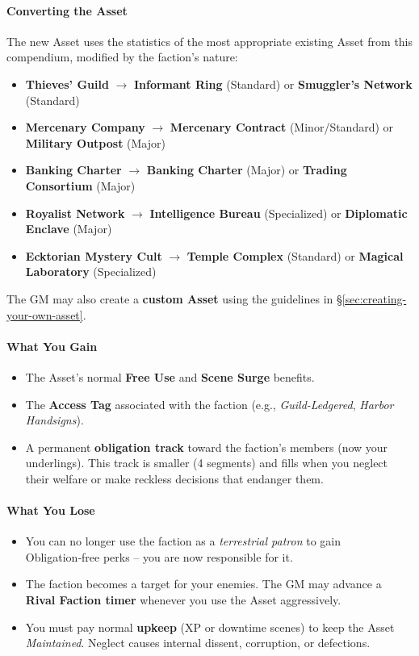 \begin{tcolorbox}[colback=black!3!white,colframe=black!60!white,title=From Faction to Asset: Taking Over a Terrestrial Patron,label=sec:takeover-sidebar,breakable]
\paragraph{Converting the Asset}
The new Asset uses the statistics of the most appropriate existing Asset from this compendium, modified by the faction's nature:
\begin{itemize}
  \item \textbf{Thieves' Guild} $\rightarrow$ \textbf{Informant Ring} (Standard) or \textbf{Smuggler's Network} (Standard)
  \item \textbf{Mercenary Company} $\rightarrow$ \textbf{Mercenary Contract} (Minor/Standard) or \textbf{Military Outpost} (Major)
  \item \textbf{Banking Charter} $\rightarrow$ \textbf{Banking Charter} (Major) or \textbf{Trading Consortium} (Major)
  \item \textbf{Royalist Network} $\rightarrow$ \textbf{Intelligence Bureau} (Specialized) or \textbf{Diplomatic Enclave} (Major)
  \item \textbf{Ecktorian Mystery Cult} $\rightarrow$ \textbf{Temple Complex} (Standard) or \textbf{Magical Laboratory} (Specialized)
\end{itemize}
The GM may also create a \textbf{custom Asset} using the guidelines in \S\ref{sec:creating-your-own-asset}.

\paragraph{What You Gain}
\begin{itemize}
  \item The Asset's normal \textbf{Free Use} and \textbf{Scene Surge} benefits.
  \item The \textbf{Access Tag} associated with the faction (e.g., \textit{Guild-Ledgered}, \textit{Harbor Handsigns}).
  \item A permanent \textbf{obligation track} toward the faction's members (now your underlings). This track is smaller (4 segments) and fills when you neglect their welfare or make reckless decisions that endanger them.
\end{itemize}

\paragraph{What You Lose}
\begin{itemize}
  \item You can no longer use the faction as a \emph{terrestrial patron} to gain Obligation‑free perks -- you are now responsible for it.
  \item The faction becomes a target for your enemies. The GM may advance a \textbf{Rival Faction timer} whenever you use the Asset aggressively.
  \item You must pay normal \textbf{upkeep} (XP or downtime scenes) to keep the Asset \emph{Maintained}. Neglect causes internal dissent, corruption, or defections.
\end{itemize}


\end{tcolorbox}
